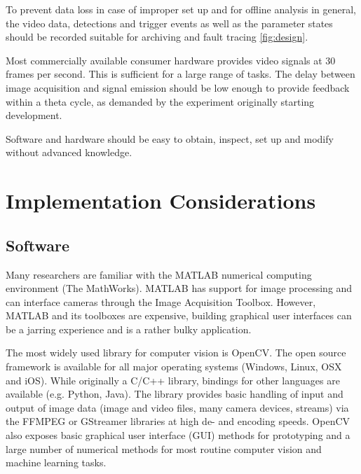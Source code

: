 	To prevent data loss in case of improper set up and for offline analysis in general, the video data, detections and trigger events as well as the parameter states should be recorded suitable for archiving and fault tracing \ref{fig:design}.

Most commercially available consumer hardware provides video signals at 30 frames per second. This is sufficient for a large range of tasks. The delay between image acquisition and signal emission should be low enough to provide feedback within a theta cycle, as demanded by the experiment originally starting development.

Software and hardware should be easy to obtain, inspect, set up and modify  without advanced knowledge.

\newpage
\section{Implementation Considerations}
\label{sec:implementation}
	\subsection{Software}
	Many researchers are familiar with the MATLAB numerical computing environment (The MathWorks). MATLAB has support for image processing and can interface cameras through the Image Acquisition Toolbox. However, MATLAB and its toolboxes are expensive, building graphical user interfaces can be a jarring experience and is a rather bulky application.
	
	The most widely used library for computer vision is OpenCV. The open source framework is available for all major operating systems (Windows, Linux, OSX and iOS). While originally a C/C++ library, bindings for other languages are available (e.g. Python, Java). The library provides basic handling of input and output of image data (image and video files, many camera devices, streams) via the FFMPEG or GStreamer libraries at high de- and encoding speeds. OpenCV also exposes basic graphical user interface (GUI) methods for prototyping and a large number of numerical methods for most routine computer vision and machine learning tasks.
	
